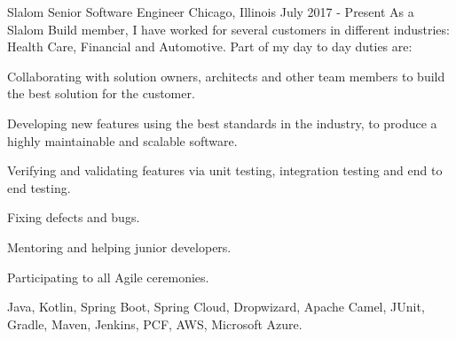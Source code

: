 
\begin{cventries}

  \experienceentry
  {Slalom} %
    {Senior Software Engineer} %
    {Chicago, Illinois} %
    {July 2017 - Present} %
    {As a Slalom Build member, I have worked for several customers in different industries: Health Care, Financial and Automotive. Part of my day to day duties are:}
    {
      \begin{cvitems} %
      	\item {Collaborating with solution owners, architects and other team members to build the best solution for the customer.}
      	\item {Developing new features using the best standards in the industry, to produce a highly maintainable and scalable software.}
      	\item {Verifying and validating features via unit testing, integration testing and end to end testing.}
      	\item {Fixing defects and bugs.}
      	\item {Mentoring and helping junior developers.}
        \item {Participating to all Agile ceremonies.}
      \end{cvitems}
    }
    {Java, Kotlin, Spring Boot, Spring Cloud, Dropwizard, Apache Camel, JUnit, Gradle, Maven, Jenkins, PCF, AWS, Microsoft Azure.}
  

\end{cventries}
